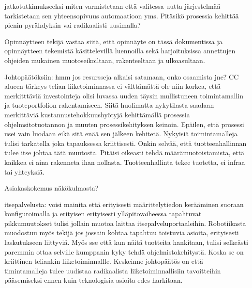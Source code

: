 \documentclass[finnish,12pt,a4paper,pdftex]{article}
\begin{document}
jatkotutkimukseeksi 
miten varmistetaan että valitessa uutta järjestelmää tarkistetaan sen yhteensopivuus automaatioon yms. 
Pitäsikö prosessia kehittää pienin pyrähdyksin vai radikaalisti uusimalla?

Opinnäytteen tekijä vastaa siitä, että opinnäyte on tässä dokumentissa
ja opinnäytteen tekemistä käsittelevillä luennoilla sekä
harjoituksissa annettujen ohjeiden mukainen muotoseikoiltaan,
rakenteeltaan ja ulkoasultaan.

Johtopäätöksiin:
hmm jos resursseja alkaisi satamaan, onko osaamista jne?
CC alueen tärkeys telian liiketoiminnassa ei välttämättä ole niin korkea, että merkitttäviä investointeja olisi luvassa uuden täysin mullistuneen toimintamallin ja tuoteportfolion rakentamiseen. Siitä huolimatta nykytilasta saadaan merkittäviä kustannustehokkuushyötyjä kehittämällä prosessia ohjelmsitotuotannon ja muuten prosessikehityksen keinoin. Epäilen, että prosessi usei vain luodaan eikä sitä enää sen jälkeen kehitetä. Nykyisiä toimintamalleja tulisi tarkatella joka tapauksessa kriittisesti. Onkin selvää, että tuotteenhallinnan tulee itse johtaa tätä muutosta. 
Pitäisi oikeasti tehdä määrämuotoistamista, että kaikkea ei aina rakenneta ihan nollasta. Tuotteenhallinta tekee tuotetta, ei infraa tai yhteyksiä. 

Asiakaskokemus näkökulmasta?

itsepalvelusta: voisi mainita että erityisesti määrittelytiedon kerääminen suoraan konfiguroimalla ja erityisen erityisesti ylläpitovaiheessa tapahtuvat pikkumuutokset tulisi jollain muotoa laittaa itsepalveluportaaleihin.
Robotiikasta muodostuu myös tekijä jos jossain kohtaa tapahtuu toistuvia asioita, erityisesti laskutukseen liittyviä.
Myös sse että kun näitä tuotteita hankitaan, tulisi selkeästi paremmin ottaa selville kumppanin kyky tehdä ohjelmistokehitystä. Koska se on kriittinen teliankin liiketoiminnallle.
Keskeinne johtopäätös on että timintamalleja tulee uudistaa radikaalista liiketoiminnallisiin tavoitteihin pääsemiseksi ennen kuin teknologisia asioita edes harkitaan. 

\clearpage
\end{document}
